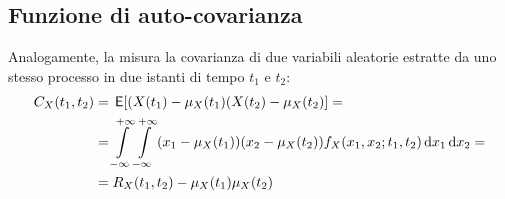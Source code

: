 \subsection{Funzione di auto-covarianza}
Analogamente, la  misura la covarianza di due variabili aleatorie estratte da uno stesso processo in due istanti di tempo $t_1$ e $t_2$:
\begin{equation}\label{eq:proc_autocovarianza}\begin{split}
C_X(t_1,t_2)&=\,{\operatorname{\mathsf{E}}}\!\left[{(X(t_1)-\mu_X(t_1)(X(t_2)-\mu_X(t_2)}\right]=\\
&=\int\limits_{-\infty}^{+\infty}{\int\limits_{-\infty}^{+\infty}{(x_1-\mu_X(t_1))(x_2-\mu_X(t_2)) f_X(x_1,x_2;t_1,t_2)}{\,\mathop{}\!\mathrm{d}{x_1}}}{\,\mathop{}\!\mathrm{d}{x_2}}=\\
&=R_X(t_1,t_2)-\mu_X(t_1)\mu_X(t_2)
\end{split}\end{equation}


